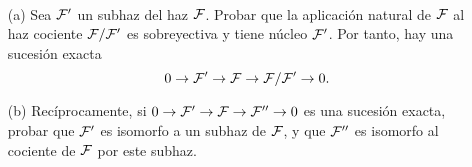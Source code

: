 \documentclass[twoside]{article}
\begin{document}

\begin{ejercicio}{1.6}\
\begin{enumerate}
\item[(a)]
Sea $\mathcal{F}'$ un subhaz del haz $\mathcal{F}$. Probar que la aplicación natural de $\mathcal{F}$ al haz cociente $\mathcal{F}/\mathcal{F}'$ es sobreyectiva y tiene núcleo $\mathcal{F}'$. Por tanto, hay una sucesión exacta 
\[
0\to \mathcal{F}'\to\mathcal{F}\to \mathcal{F}/\mathcal{F}'\to 0.
\]

\item[(b)] Recíprocamente, si $0\to \mathcal{F}'\to\mathcal{F}\to \mathcal{F}''\to 0$ es una sucesión exacta, probar que $\mathcal{F}'$ es isomorfo a un subhaz de $\mathcal{F}$, y que $\mathcal{F}''$ es isomorfo al cociente de $\mathcal{F}$ por este subhaz.
\end{enumerate}
\end{ejercicio}
\end{document}
